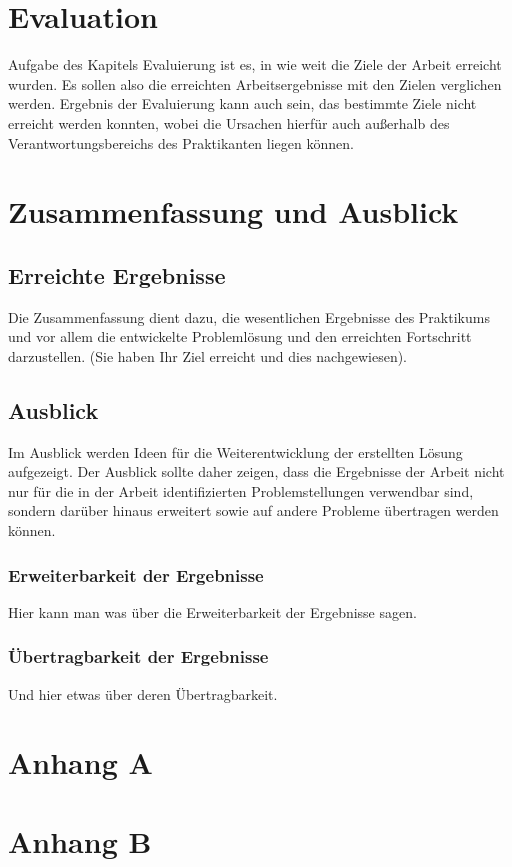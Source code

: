 \documentclass[oneside]{ausarbeitung}
\begin{document}
\chapter{Evaluation}
\label{cha:evaluation}
Aufgabe des Kapitels Evaluierung ist es, in wie weit die Ziele der 
Arbeit erreicht wurden. Es sollen also die erreichten Arbeitsergebnisse 
mit den Zielen verglichen werden. Ergebnis der Evaluierung kann auch 
sein, das bestimmte Ziele nicht erreicht werden konnten, wobei die 
Ursachen hierfür auch außerhalb des Verantwortungsbereichs des 
Praktikanten liegen können.

\chapter{Zusammenfassung und Ausblick}
\label{cha:zusammenfassung}

\section{Erreichte Ergebnisse}
\label{sec:ergebnisse}

Die Zusammenfassung dient dazu, die wesentlichen Ergebnisse des 
Praktikums und vor allem die entwickelte Problemlösung und den 
erreichten Fortschritt darzustellen. (Sie haben Ihr Ziel erreicht und 
dies nachgewiesen).

\section{Ausblick}
\label{sec:ausblick}

Im Ausblick werden Ideen für die Weiterentwicklung der erstellten Lösung 
aufgezeigt. Der Ausblick sollte daher zeigen, dass die Ergebnisse der 
Arbeit nicht nur für die in der Arbeit identifizierten Problemstellungen 
verwendbar sind, sondern darüber hinaus erweitert sowie auf andere 
Probleme übertragen werden können.

\subsection{Erweiterbarkeit der Ergebnisse}
\label{sub:erweiterbarkeit}

Hier kann man was über die Erweiterbarkeit der Ergebnisse sagen.

\subsection{Übertragbarkeit der Ergebnisse}
\label{sub:uebertragbarkeit}

Und hier etwas über deren Übertragbarkeit.

\appendix

\printbibliography[heading=bibintoc]

\chapter{Anhang A}

\chapter{Anhang B}
\end{document}
